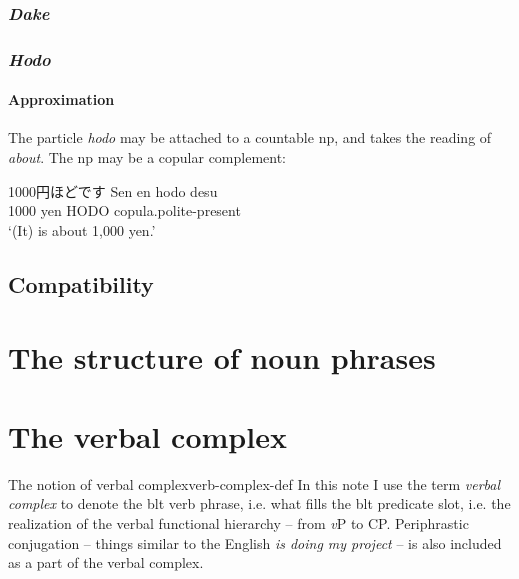 \documentclass[UTF8, a4paper, oneside, scheme=plain]{ctexrep}
\newcommand*{\term}[1]{\emph{#1}}
\newcommand{\corpus}[1]{\emph{#1}}
\newcommand{\translate}[1]{`#1'}
\newcommand{\vP}{\textit{v}P}
\begin{document}
\subsection{\corpus{Dake}}\label{sec:dake}

\subsection{\corpus{Hodo}}

\subsubsection{Approximation}

The particle \corpus{hodo} may be attached to a countable \ac{np},
and takes the reading of \corpus{about}.
The \ac{np} may be a copular complement:
\begin{exe}
    \ex 1000円ほどです 
    \gll Sen en hodo desu \\
    1000 yen HODO \acs{copula}.\acs{polite}-\acs{present} \\
    \glt \translate{(It) is about 1,000 yen.}
\end{exe}

\section{Compatibility}\label{sec:particle-compatible}



\chapter{The structure of noun phrases}

\chapter{The verbal complex}\label{chap:verb-complex}

\begin{theorybox}{The notion of verbal complex}{verb-complex-def}
    In this note I use the term \term{verbal complex} to denote the \ac{blt} verb phrase,
    i.e. what fills the \ac{blt} predicate slot,
    i.e. the realization of the verbal functional hierarchy -- from \vP{} to CP.
    Periphrastic conjugation -- things similar to the English \corpus{is doing my project} -- 
    is also included as a part of the verbal complex.
\end{theorybox}
\end{document}
